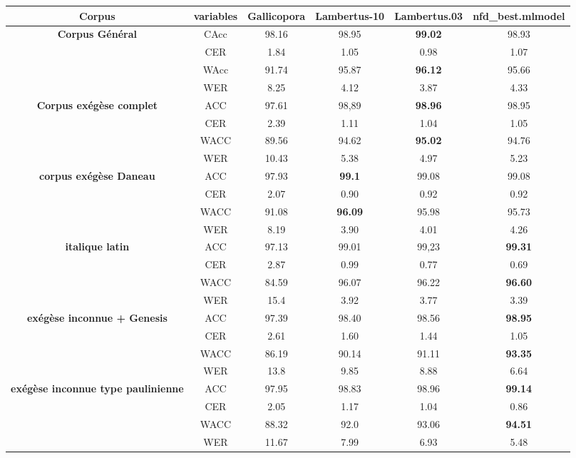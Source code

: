 \centering
    \small
        \begin{tabular}{|c|c|c|c|c|c|}
        \hline
        \textbf{Corpus} & \textbf{variables}  & \textbf{Gallicopora} & \textbf{Lambertus-10} & \textbf{Lambertus.03} & \textbf{nfd\_best.mlmodel} \\
        \hline
        \multirow{4}{*}{\textbf{Corpus Général}}
         & CAcc & 98.16 & 98.95 & \textbf{99.02} & 98.93\\ 
         & CER & 1.84 & 1.05 & 0.98 & 1.07\\
         & WAcc & 91.74 & 95.87 & \textbf{96.12} & 95.66 \\
         & WER & 8.25 & 4.12 & 3.87 & 4.33 \\
        \hline
        \multirow{4}{*}{\textbf{Corpus exégèse complet}} 
         & ACC & 97.61 & 98,89 & \textbf{98.96} & 98.95\\
         & CER & 2.39 & 1.11 & 1.04 & 1.05\\
         & WACC & 89.56 & 94.62 & \textbf{95.02} & 94.76\\
         & WER & 10.43 & 5.38 & 4.97 & 5.23 \\
        \hline
        \multirow{4}{*}{\textbf{corpus exégèse Daneau}}
         & ACC & 97.93 & \textbf{99.1} & 99.08 & 99.08\\
         & CER & 2.07 & 0.90 & 0.92 & 0.92\\
         & WACC & 91.08 & \textbf{96.09} & 95.98 & 95.73 \\
         & WER & 8.19 & 3.90 & 4.01 & 4.26 \\
        \hline
        \multirow{4}{*}{\textbf{italique latin}} 
         & ACC & 97.13 & 99.01 & 99,23 & \textbf{99.31}\\
         & CER & 2.87 & 0.99 & 0.77 & 0.69 \\
         & WACC & 84.59 & 96.07 & 96.22 & \textbf{96.60} \\
         & WER & 15.4 & 3.92 & 3.77 & 3.39 \\
        \hline
        \hline
        \multirow{4}{*}{\textbf{exégèse inconnue + Genesis}} 
        & ACC & 97.39 & 98.40 & 98.56 & \textbf{98.95}\\
        & CER & 2.61 & 1.60 & 1.44 & 1.05\\
        & WACC & 86.19 & 90.14 & 91.11 & \textbf{93.35}\\
        & WER & 13.8 & 9.85 & 8.88 & 6.64 \\
        \hline
        \multirow{4}{*}{\textbf{exégèse inconnue type paulinienne}} 
        & ACC & 97.95 & 98.83 & 98.96 & \textbf{99.14}\\
        & CER & 2.05 & 1.17 & 1.04 & 0.86\\
        & WACC & 88.32 & 92.0 & 93.06 & \textbf{94.51}\\
        & WER & 11.67 & 7.99 & 6.93 & 5.48 \\
        \hline
        \end{tabular}

